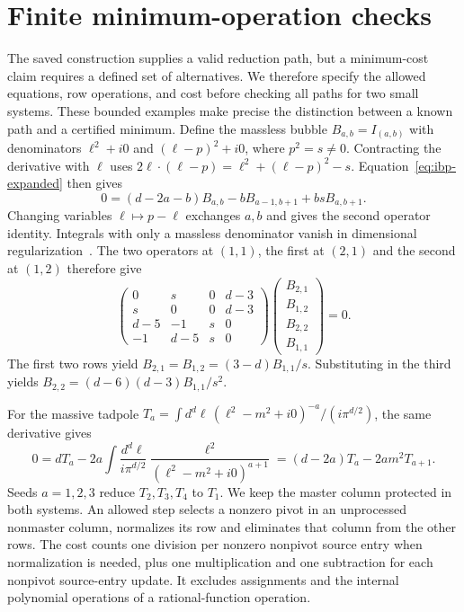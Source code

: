 \section{Finite minimum-operation checks}
\label{app:optimal}
The saved construction supplies a valid reduction path, but a minimum-cost claim requires a defined set of alternatives. We therefore specify the allowed equations, row operations, and cost before checking all paths for two small systems. These bounded examples make precise the distinction between a known path and a certified minimum. Define the massless bubble $B_{a,b}=I_{(a,b)}$ with denominators $\ell^2+i0$ and $(\ell-p)^2+i0$, where $p^2=s\ne0$. Contracting the derivative with $\ell$ uses $2\ell\cdot(\ell-p)=\ell^2+(\ell-p)^2-s$. Equation~\eqref{eq:ibp-expanded} then gives
\begin{equation}
 0=(d-2a-b)B_{a,b}-bB_{a-1,b+1}+bsB_{a,b+1}.
\end{equation}
Changing variables $\ell\mapsto p-\ell$ exchanges $a,b$ and gives the second operator identity. Integrals with only a massless denominator vanish in dimensional regularization~\cite{Weinzierl2022}. The two operators at $(1,1)$, the first at $(2,1)$ and the second at $(1,2)$ therefore give
\begin{equation}
 \begin{pmatrix}0&s&0&d-3\\s&0&0&d-3\\d-5&-1&s&0\\-1&d-5&s&0\end{pmatrix}
 \begin{pmatrix}B_{2,1}\\B_{1,2}\\B_{2,2}\\B_{1,1}\end{pmatrix}=0.
\end{equation}
The first two rows yield $B_{2,1}=B_{1,2}=(3-d)B_{1,1}/s$. Substituting in the third yields $B_{2,2}=(d-6)(d-3)B_{1,1}/s^2$.

For the massive tadpole $T_a=\int d^d\ell\,(\ell^2-m^2+i0)^{-a}/(i\pi^{d/2})$, the same derivative gives
\begin{equation}
 0=dT_a-2a\int\frac{d^d\ell}{i\pi^{d/2}}
 \frac{\ell^2}{(\ell^2-m^2+i0)^{a+1}}
 =(d-2a)T_a-2am^2T_{a+1}.
\end{equation}
Seeds $a=1,2,3$ reduce $T_2,T_3,T_4$ to $T_1$. We keep the master column protected in both systems. An allowed step selects a nonzero pivot in an unprocessed nonmaster column, normalizes its row and eliminates that column from the other rows. The cost counts one division per nonzero nonpivot source entry when normalization is needed, plus one multiplication and one subtraction for each nonpivot source-entry update. It excludes assignments and the internal polynomial operations of a rational-function operation.

